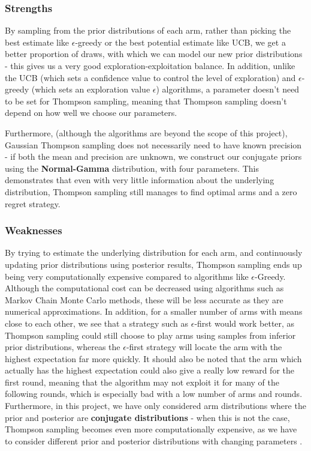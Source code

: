 \subsubsection{Strengths}
By sampling from the prior distributions of each arm, rather than picking the best estimate like $\epsilon$-greedy or the best potential estimate like UCB, we get a better proportion of draws, with which we can model our new prior distributions - this gives us a very good exploration-exploitation balance. In addition, unlike the UCB (which sets a confidence value to control the level of exploration) and $\epsilon$-greedy (which sets an exploration value $\epsilon$) algorithms, a parameter doesn't need to be set for Thompson sampling, meaning that Thompson sampling doesn't depend on how well we choose our parameters.

Furthermore, (although the algorithms are beyond the scope of this project), Gaussian Thompson sampling does not necessarily need to have known precision - if both the mean and precision are unknown, we construct our conjugate priors using the \textbf{Normal-Gamma} distribution, with four parameters. This demonstrates that even with very little information about the underlying distribution, Thompson sampling still manages to find optimal arms and a zero regret strategy.

\subsubsection{Weaknesses}
By trying to estimate the underlying distribution for each arm, and continuously updating prior distributions using posterior results, Thompson sampling ends up being very computationally expensive compared to algorithms like $\epsilon$-Greedy. \citep{mazumdar2020thompson} Although the computational cost can be decreased using algorithms such as Markov Chain Monte Carlo methods, these will be less accurate as they are numerical approximations. \citep{mazumdar2020thompson} In addition, for a smaller number of arms with means close to each other, we see that a strategy such as $\epsilon$-first would work better, as Thompson sampling could still choose to play arms using samples from inferior prior distributions, whereas the $\epsilon$-first strategy will locate the arm with the highest expectation far more quickly. It should also be noted that the arm which actually has the highest expectation could also give a really low reward for the first round, meaning that the algorithm may not exploit it for many of the following rounds, which is especially bad with a low number of arms and rounds. Furthermore, in this project, we have only considered arm distributions where the prior and posterior are \textbf{conjugate distributions} - when this is not the case, Thompson sampling becomes even more computationally expensive, as we have to consider different prior and posterior distributions with changing parameters \citep{zhou2018racing}.

